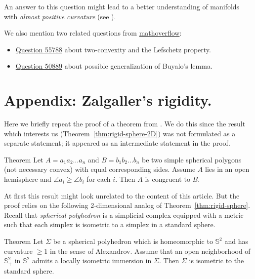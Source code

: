 \documentclass[oneside,a4paper]{article}
\begin{document}
An answer to this question might lead to a better understanding of manifolds with \emph{almost positive curvature} (see \cite{ziller}).

\medskip

We also mention two related questions from \href{http://mathoverflow.net/}{mathoverflow}:
\begin{itemize}
 \item \href{http://mathoverflow.net/questions/55788}{Question 55788}
about two-convexity and the Lefschetz property.
\item \href{http://mathoverflow.net/questions/50889}{Question  50889}
about possible generalization of Buyalo's lemma.
\end{itemize}


\def\claim#1{\par\medskip\noindent\refstepcounter{thm}\hbox{\bf \Alph{section}.\arabic{thm}. #1.}
\it\ %
}

\appendix
\setcounter{section}{1}
\setcounter{thm}{0}
\section*{Appendix: Zalgaller's rigidity.}\label{subsec:zalgaller}
Here we briefly repeat the proof of a theorem from \cite{zalgaller}.
We do this since the result which interests us (Theorem~\ref{thm:rigid-sphere-2D}) was not formulated as a separate statement;
it appeared as an intermediate statement in the proof.

\begin{thm}{Theorem}\label{thm:zalgaller}
Let $A=a_1a_2\dots a_n$ and $B=b_1b_2\dots b_n$ be two simple spherical polygons (not necessary convex)
with equal corresponding sides.
Assume $A$ lies in an open hemisphere and $\angle a_i\ge\angle b_i$ for each $i$.
Then $A$ is congruent to $B$.

\end{thm}

At first this result might look unrelated to the content of this article.
But the proof relies on the following 2-dimensional analog of Theorem~\ref{thm:rigid-sphere}.
Recall that \emph{spherical polyhedron} is a simplicial complex equipped with a metric such that each simplex is isometric to a simplex in a standard sphere.

\begin{thm}{Theorem}\label{thm:rigid-sphere-2D}
Let $\Sigma$ be a spherical polyhedron which is homeomorphic to $\mathbb S^2$ and has curvature $\ge 1$ in the sense of Alexandrov. Assume that an open neighborhood of $\mathbb S^2_+$ in $\mathbb S^2$
admits a locally isometric immersion in $\Sigma$.
Then $\Sigma$ is isometric to the standard sphere.
\end{thm}
\end{document}
